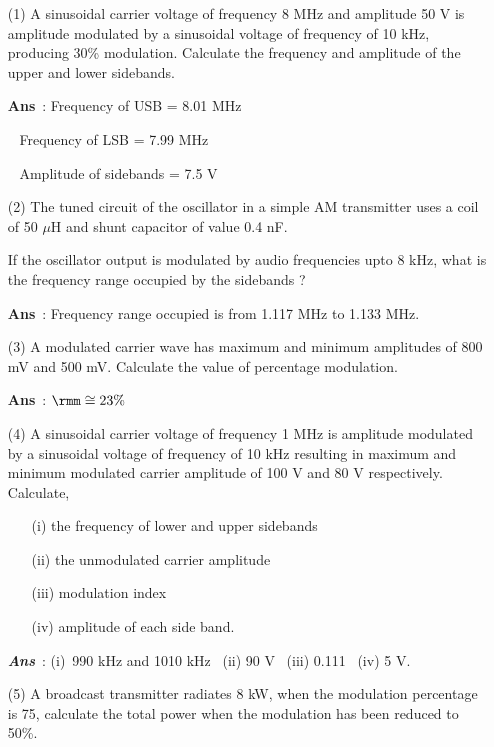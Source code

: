 \begin{enumerate}
\item[(1)] A sinusoidal carrier voltage of frequency 8 MHz and
amplitude 50 V is amplitude modulated by a sinusoidal voltage of
frequency of 10 kHz, producing 30\% modulation. Calculate the
frequency and amplitude of the  upper and lower sidebands. 

{{\textbf{Ans}}~:} Frequency of USB = 8.01 MHz

\qquad ~ Frequency of LSB = 7.99 MHz

\qquad ~ Amplitude of sidebands = 7.5 V

\item[(2)] The tuned circuit of the oscillator in a simple AM
transmitter uses a coil of 50 $\mu$H and shunt capacitor of value 0.4
nF.

If the oscillator output is modulated by audio frequencies upto 8 kHz,
what is the frequency range occupied by the sidebands ?

{{\textbf{Ans}}~:} Frequency range occupied is from 1.117 MHz
to 1.133 MHz.

\item[(3)] A modulated carrier wave has maximum and minimum amplitudes
of 800 mV and 500 mV. Calculate the value of percentage modulation.

{{\textbf{Ans}}~:} $\rmm \cong 23\%$

\item[(4)] A sinusoidal carrier voltage of frequency 1 MHz is amplitude
modulated by a sinusoidal voltage of frequency of 10 kHz resulting in
maximum and minimum modulated carrier amplitude of 100 V and 80 V
respectively. Calculate,
\begin{itemize}
\item[(i)] the frequency of lower and upper sidebands

\item[(ii)] the unmodulated carrier amplitude

\item[(iii)] modulation index

\item[(iv)] amplitude of each side band.
\end{itemize}

{\textit{\textbf{Ans}}~:} (i)~990 kHz and 1010 kHz ~(ii) 90 V ~(iii)
0.111 ~(iv) 5 V.

\item[(5)] A broadcast transmitter radiates 8 kW, when the modulation
percentage is 75, calculate the total power when the modulation has
been reduced to 50\%. 


\end{enumerate}
